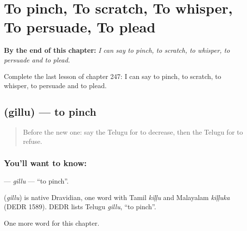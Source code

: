 
\chapter{To pinch, To scratch, To whisper, To persuade, To plead}
\label{ch:te-to-pinch-to-scratch-to-whisper-to-persuade-to-plead}

\begin{chapteropening}
\textbf{By the end of this chapter:} \emph{I can say to pinch, to scratch, to whisper, to persuade and to plead.}

Complete the last lesson of chapter 247: I can say to pinch, to scratch, to whisper, to persuade and to plead.
\end{chapteropening}

\section[\texorpdfstring{\te{గిల్లు} (gillu)}{గిల్లు (gillu)}]{ (gillu) — to pinch}

\label{lesson:TE-C247-gillu}



\begin{quote}
Before the new one: say the Telugu for to decrease, then the Telugu for to refuse.
\end{quote}

\subsection*{You'll want to know: }
\textbf{} — \emph{gillu} — \textquotedblleft{}to pinch\textquotedblright{}.

\begin{cousinweb}
\textbf{} (\emph{gillu}) is native Dravidian, one word with Tamil \emph{kiḷḷu} and Malayalam \emph{kiḷḷuka} (DEDR 1589). DEDR lists Telugu \emph{gillu}, \textquotedblleft{}to pinch\textquotedblright{}.
\end{cousinweb}

\begin{grammarlens}[title={What you've built}]
One more word for this chapter.
\end{grammarlens}

